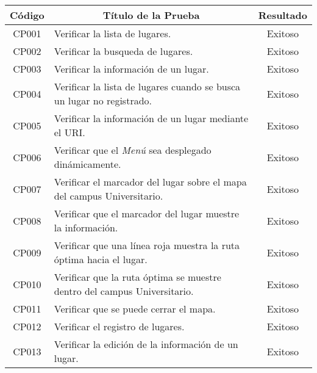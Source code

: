     \begin{longtable}{ c  X  c }
      \toprule
        \textbf{Código} &
        \multicolumn{1}{c}{\textbf{Título de la Prueba}} &
        \textbf{Resultado}\\

\midrule
CP001
&
Verificar la lista de lugares.
&
Exitoso \\

CP002
&
Verificar la busqueda de lugares.
&
Exitoso \\

CP003
&
Verificar la información de un lugar.
&
Exitoso \\

CP004
&
Verificar la lista de lugares cuando se busca un lugar no registrado.
&
Exitoso \\

CP005
&
Verificar la información de un lugar mediante el URI.
&
Exitoso \\

CP006
&
Verificar que el \emph{Menú} sea desplegado dinámicamente.
&
Exitoso \\

CP007
&
Verificar el marcador del lugar sobre el mapa del campus Universitario.
&
Exitoso \\

CP008
&
Verificar que el marcador del lugar muestre la información.
&
Exitoso \\


CP009
&
Verificar que una línea roja muestra la ruta óptima hacia el lugar.
&
Exitoso \\

CP010
&
Verificar que la ruta óptima se muestre dentro del campus Universitario.
&
Exitoso \\


CP011
&
Verificar que se puede cerrar el mapa.
&
Exitoso \\

CP012
&
Verificar el registro de lugares.
&
Exitoso \\

CP013
&
Verificar la edición de la información de un lugar.
&
Exitoso \\



\end{longtable}
